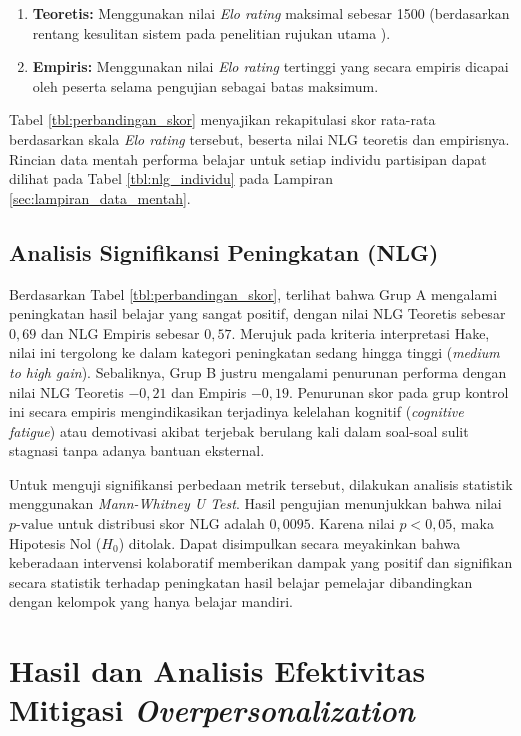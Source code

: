 \begin{enumerate}
    \item \textbf{Teoretis:} Menggunakan nilai \textit{Elo rating} maksimal sebesar 1500 (berdasarkan rentang kesulitan sistem pada penelitian rujukan utama \textcite{Vesin2022}).
    \item \textbf{Empiris:} Menggunakan nilai \textit{Elo rating} tertinggi yang secara empiris dicapai oleh peserta selama pengujian sebagai batas maksimum.
\end{enumerate}

Tabel \ref{tbl:perbandingan_skor} menyajikan rekapitulasi skor rata-rata berdasarkan skala \textit{Elo rating} tersebut, beserta nilai NLG teoretis dan empirisnya. Rincian data mentah performa belajar untuk setiap individu partisipan dapat dilihat pada Tabel \ref{tbl:nlg_individu} pada Lampiran \ref{sec:lampiran_data_mentah}.



\subsection{Analisis Signifikansi Peningkatan (NLG)}
Berdasarkan Tabel \ref{tbl:perbandingan_skor}, terlihat bahwa Grup A mengalami peningkatan hasil belajar yang sangat positif, dengan nilai NLG Teoretis sebesar $0,69$ dan NLG Empiris sebesar $0,57$. Merujuk pada kriteria interpretasi Hake, nilai ini tergolong ke dalam kategori peningkatan sedang hingga tinggi (\textit{medium to high gain}). Sebaliknya, Grup B justru mengalami penurunan performa dengan nilai NLG Teoretis $-0,21$ dan Empiris $-0,19$. Penurunan skor pada grup kontrol ini secara empiris mengindikasikan terjadinya kelelahan kognitif (\textit{cognitive fatigue}) atau demotivasi akibat terjebak berulang kali dalam soal-soal sulit stagnasi tanpa adanya bantuan eksternal.

Untuk menguji signifikansi perbedaan metrik tersebut, dilakukan analisis statistik menggunakan \textit{Mann-Whitney U Test}. Hasil pengujian menunjukkan bahwa nilai $p\text{-value}$ untuk distribusi skor NLG adalah $0,0095$. Karena nilai $p < 0,05$, maka Hipotesis Nol ($H_0$) ditolak. Dapat disimpulkan secara meyakinkan bahwa keberadaan intervensi kolaboratif memberikan dampak yang positif dan signifikan secara statistik terhadap peningkatan hasil belajar pemelajar dibandingkan dengan kelompok yang hanya belajar mandiri.

\section{Hasil dan Analisis Efektivitas Mitigasi \textit{Overpersonalization}}
\label{sec:hasil_mitigasi}

